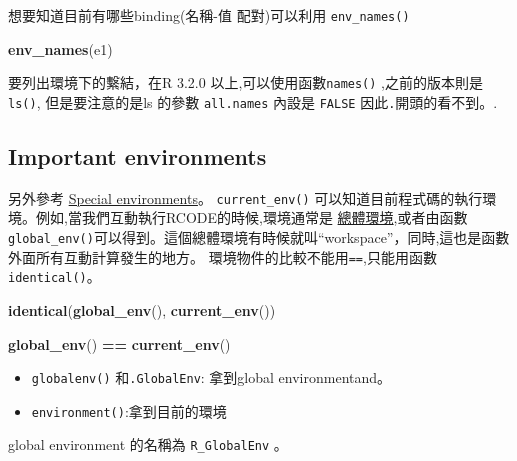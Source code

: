 \documentclass[]{book}
\newenvironment{Shaded}{\begin{snugshade}}{\end{snugshade}}
\newcommand{\KeywordTok}[1]{\textcolor[rgb]{0.13,0.29,0.53}{\textbf{#1}}}
\newcommand{\NormalTok}[1]{#1}
\newcommand{\OperatorTok}[1]{\textcolor[rgb]{0.81,0.36,0.00}{\textbf{#1}}}
\newcommand{\StringTok}[1]{\textcolor[rgb]{0.31,0.60,0.02}{#1}}
\providecommand{\tightlist}{%
  \setlength{\itemsep}{0pt}\setlength{\parskip}{0pt}}
\theoremstyle{definition}
\theoremstyle{definition}
\theoremstyle{definition}
\theoremstyle{remark}
\begin{document}
想要知道目前有哪些binding(名稱-值 配對)可以利用 \texttt{env\_names()}

\begin{Shaded}
\begin{Highlighting}[]
\KeywordTok{env_names}\NormalTok{(e1)}
\end{Highlighting}
\end{Shaded}

要列出環境下的繫結，在R 3.2.0 以上,可以使用函數\texttt{names()}
,之前的版本則是 \texttt{ls()}, 但是要注意的是ls 的參數
\texttt{all.names} 內設是 \texttt{FALSE} 因此\texttt{.}開頭的看不到。.

\hypertarget{important-environments}{%
\subsection{Important environments}\label{important-environments}}

另外參考 \protect\hyperlink{function-envs}{Special environments}。
\texttt{current\_env()}
可以知道目前程式碼的執行環境。例如,當我們互動執行RCODE的時候,環境通常是
\protect\hyperlink{globalux5cux2520environment}{總體環境},或者由函數\texttt{global\_env()}可以得到。這個總體環境有時候就叫``workspace''，同時,這也是函數外面所有互動計算發生的地方。
環境物件的比較不能用\texttt{==},只能用函數\texttt{identical()}。

\begin{Shaded}
\begin{Highlighting}[]
\KeywordTok{identical}\NormalTok{(}\KeywordTok{global_env}\NormalTok{(), }\KeywordTok{current_env}\NormalTok{())}
\end{Highlighting}
\end{Shaded}

\begin{Shaded}
\begin{Highlighting}[]
\KeywordTok{global_env}\NormalTok{() }\OperatorTok{==}\StringTok{ }\KeywordTok{current_env}\NormalTok{()}
\end{Highlighting}
\end{Shaded}

\begin{itemize}
\tightlist
\item
  \texttt{globalenv()} 和\texttt{.GlobalEnv}: 拿到global
  environmentand。
\item
  \texttt{environment()}:拿到目前的環境
\end{itemize}

global environment 的名稱為 \texttt{R\_GlobalEnv} 。
\end{document}
